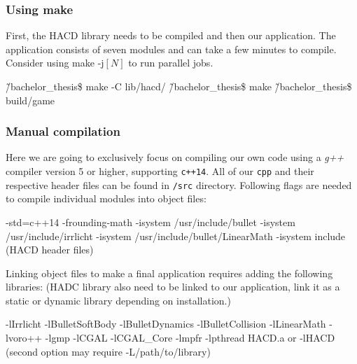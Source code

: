 \subsubsection{Using make}
First,  the HACD library needs to be compiled and then our application. The application consists of seven modules and can take a few minutes to compile. Consider using make -j$[N]$ to run parallel jobs.
\begin{code}
\~/bachelor_thesis\$ make -C lib/hacd/
\~/bachelor_thesis\$ make
\~/bachelor_thesis\$ build/game
\end{code}

\subsubsection{Manual compilation}
Here we are going to exclusively focus on compiling our own code using a \emph{g++} compiler version 5 or higher, supporting {\tt c++14}. All of our {\tt cpp} and their respective header files can be found in {\tt /src} directory.
Following flags are needed to compile individual modules into object files:
\begin{code}
-std=c++14
-frounding-math
-isystem /usr/include/bullet 
-isystem /usr/include/irrlicht 
-isystem /usr/include/bullet/LinearMath 
-isystem include (HACD header files)
\end{code}

Linking object files to make a final application requires adding the following libraries: (HADC library also need to be linked to our application, link it as a static or dynamic library depending on installation.)
\begin{code}
-lIrrlicht 
-lBulletSoftBody 
-lBulletDynamics 
-lBulletCollision    
-lLinearMath 
-lvoro++ 
-lgmp 
-lCGAL 
-lCGAL_Core 
-lmpfr 
-lpthread
HACD.a or -lHACD (second option may require -L/path/to/library)
\end{code}













